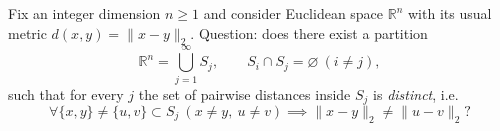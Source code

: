 Fix an integer dimension $n\ge 1$ and consider Euclidean space $\mathbb{R}^n$ with its usual metric $d(x,y)=\|x-y\|_2$.
Question: does there exist a partition
\[
\mathbb{R}^n = \bigcup_{j=1}^{\infty} S_j,\qquad S_i\cap S_j=\varnothing\ (i\neq j),
\]
such that for every $j$ the set of pairwise distances inside $S_j$ is \emph{distinct}, i.e.
\[
\forall\{x,y\}\neq\{u,v\}\subset S_j\ (x\neq y,\ u\neq v)\implies \|x-y\|_2\neq \|u-v\|_2?
\]
